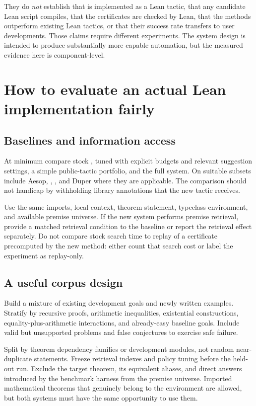 They do \emph{not} establish that \forge{} is implemented as a Lean tactic, that any candidate Lean script compiles, that the certificates are checked by Lean, that the methods outperform existing Lean tactics, or that their success rate transfers to user developments. Those claims require different experiments. The system design is intended to produce substantially more capable automation, but the measured evidence here is component-level.

\section{How to evaluate an actual Lean implementation fairly}

\subsection{Baselines and information access}

At minimum compare stock \grind{}, tuned \grind{} with explicit budgets and relevant suggestion settings, a simple public-tactic portfolio, and the full \forge{} system. On suitable subsets include Aesop, , , and Duper where they are applicable. The comparison should not handicap \grind{} by withholding library annotations that the new tactic receives.

Use the same imports, local context, theorem statement, typeclass environment, and available premise universe. If the new system performs premise retrieval, provide a matched retrieval condition to the baseline or report the retrieval effect separately. Do not compare stock search time to replay of a certificate precomputed by the new method: either count that search cost or label the experiment as replay-only.

\subsection{A useful corpus design}

Build a mixture of existing development goals and newly written examples. Stratify by recursive proofs, arithmetic inequalities, existential constructions, equality-plus-arithmetic interactions, and already-easy baseline goals. Include valid but unsupported problems and false conjectures to exercise safe failure.

Split by theorem dependency families or development modules, not random near-duplicate statements. Freeze retrieval indexes and policy tuning before the held-out run. Exclude the target theorem, its equivalent aliases, and direct answers introduced by the benchmark harness from the premise universe. Imported mathematical theorems that genuinely belong to the environment are allowed, but both systems must have the same opportunity to use them.

